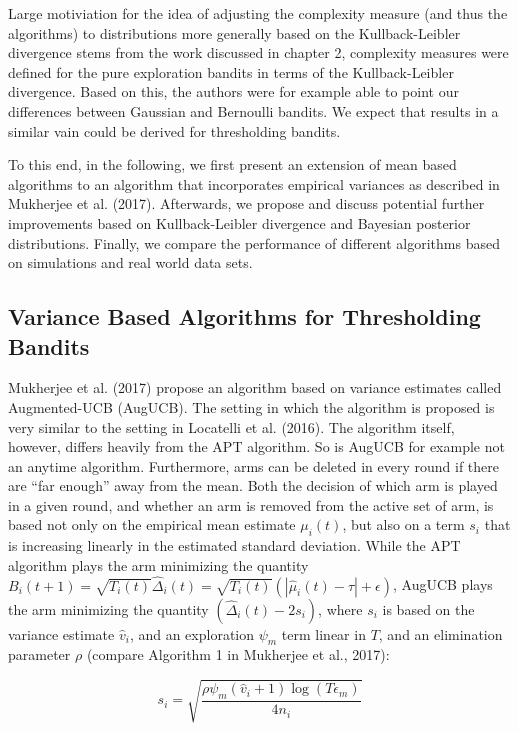 \documentclass[12pt,]{article}
\begin{document}
Large motiviation for the idea of adjusting the complexity measure (and
thus the algorithms) to distributions more generally based on the
Kullback-Leibler divergence stems from the work discussed in chapter 2,
complexity measures were defined for the pure exploration bandits in
terms of the Kullback-Leibler divergence. Based on this, the authors
were for example able to point our differences between Gaussian and
Bernoulli bandits. We expect that results in a similar vain could be
derived for thresholding bandits.

To this end, in the following, we first present an extension of mean
based algorithms to an algorithm that incorporates empirical variances
as described in Mukherjee et al. (2017). Afterwards, we propose and
discuss potential further improvements based on Kullback-Leibler
divergence and Bayesian posterior distributions. Finally, we compare the
performance of different algorithms based on simulations and real world
data sets.

\subsection{Variance Based Algorithms for Thresholding
Bandits}\label{variance-based-algorithms-for-thresholding-bandits}

Mukherjee et al. (2017) propose an algorithm based on variance estimates
called Augmented-UCB (AugUCB). The setting in which the algorithm is
proposed is very similar to the setting in Locatelli et al. (2016). The
algorithm itself, however, differs heavily from the APT algorithm. So is
AugUCB for example not an anytime algorithm. Furthermore, arms can be
deleted in every round if there are ``far enough'' away from the mean.
Both the decision of which arm is played in a given round, and whether
an arm is removed from the active set of arm, is based not only on the
empirical mean estimate \(\mu_i(t)\), but also on a term \(s_i\) that is
increasing linearly in the estimated standard deviation. While the APT
algorithm plays the arm minimizing the quantity
\(B_i(t+1) = \sqrt{T_i(t)} \hat{\Delta}_i(t) = \sqrt{T_i(t)} (|\hat{\mu}_i(t) - \tau| + \epsilon)\),
AugUCB plays the arm minimizing the quantity
\((\hat{\Delta}_i(t) - 2s_i)\), where \(s_i\) is based on the variance
estimate \(\hat{v}_i\), and an exploration \(\psi_m\) term linear in
\(T\), and an elimination parameter \(\rho\) (compare Algorithm 1 in
Mukherjee et al., 2017):

\begin{equation*}
s_i = \sqrt{\frac{\rho \psi_m (\hat{v}_i + 1) \log(T \epsilon_m)}{4n_i}}
\end{equation*}
\end{document}
